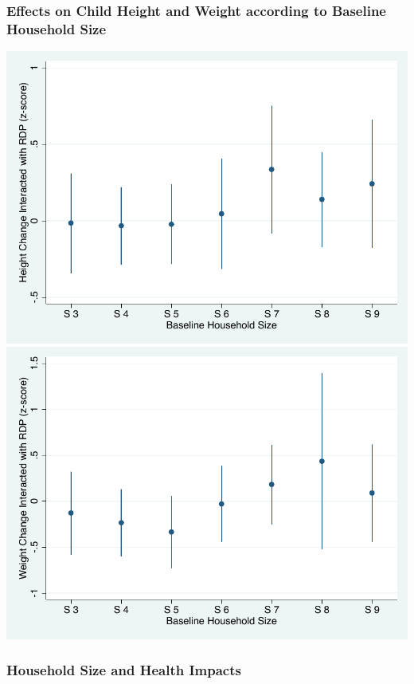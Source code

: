 \documentclass[aspectratio=149]{beamer}
\begin{document}
\begin{frame}
\frametitle{Effects on Child Height and Weight according to Baseline Household Size}
\begin{center}
\hspace*{-10mm}
  \includegraphics[scale = 0.49]{height_ch.pdf}
  \includegraphics[scale = 0.49]{weight_ch.pdf}
\end{center}
\end{frame}

\begin{frame}
\frametitle{Household Size and Health Impacts}
\resizebox{\textwidth}{!}{  

}
\end{frame}
\end{document}
